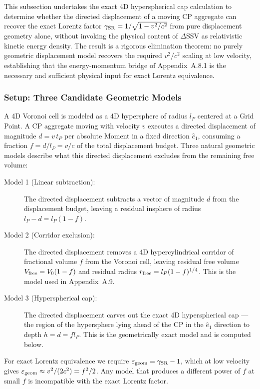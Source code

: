 \documentclass[11pt,letterpaper]{article}
\begin{document}
This subsection undertakes the exact 4D hyperspherical cap calculation to determine whether the directed displacement of a moving CP aggregate can recover the exact Lorentz factor $\gamma_{\rm SR} = 1/\sqrt{1-v^2/c^2}$ from pure displacement geometry alone, without invoking the physical content of $\Delta\text{SSV}$ as relativistic kinetic energy density. The result is a rigorous elimination theorem: no purely geometric displacement model recovers the required $v^2/c^2$ scaling at low velocity, establishing that the energy-momentum bridge of Appendix~A.8.1 is the necessary and sufficient physical input for exact Lorentz equivalence.

\subsubsection{Setup: Three Candidate Geometric Models}

A 4D Voronoi cell is modeled as a 4D hypersphere of radius $l_P$ centered at a Grid Point. A CP aggregate moving with velocity $v$ executes a directed displacement of magnitude $d = v\,t_P$ per absolute Moment in a fixed direction $\hat{e}_1$, consuming a fraction $f = d/l_P = v/c$ of the total displacement budget. Three natural geometric models describe what this directed displacement excludes from 
the remaining free volume:

\begin{description}
\item[Model 1 (Linear subtraction):] The directed displacement 
subtracts a vector of magnitude $d$ from the displacement budget, leaving a residual insphere of radius $l_P - d = l_P(1-f)$.

\item[Model 2 (Corridor exclusion):] The directed displacement removes a 4D hypercylindrical corridor of fractional volume $f$ from the Voronoi cell, leaving residual free volume $V_{\rm free} = V_0(1-f)$ and residual radius $r_{\rm free} = l_P(1-f)^{1/4}$. This is the model used in Appendix~A.9.

\item[Model 3 (Hyperspherical cap):] The directed displacement carves out the exact 4D hyperspherical cap — the region of the hypersphere lying ahead of the CP in the $\hat{e}_1$ direction to depth $h = d = fl_P$. This is the geometrically exact model and is computed below.
\end{description}

For exact Lorentz equivalence we require $\varepsilon_{\rm geom} = \gamma_{\rm SR} - 1$, which at low velocity gives 
$\varepsilon_{\rm geom} \approx v^2/(2c^2) = f^2/2$. Any model that produces a different power of $f$ at small $f$ is incompatible with the exact Lorentz factor.
\end{document}
